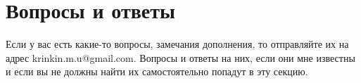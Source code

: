\section{Вопросы и ответы}

Если у вас есть какие-то вопросы, замечания дополнения, то отправляйте их на
адрес krinkin.m.u@gmail.com. Вопросы и ответы на них, если они мне известны и
если вы не должны найти их самостоятельно попадут в эту секцию.
